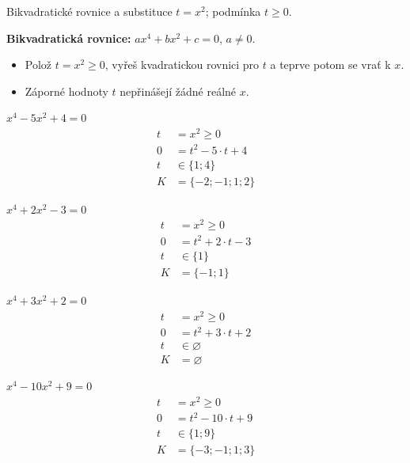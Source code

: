 \documentclass[11pt,a4paper]{article}
\begin{document}
Bikvadratické rovnice a substituce $t=x^2$; podmínka $t\ge0$.
\begin{definiceBox}[title={Definice - Bikvadratická rovnice}]
\textbf{Bikvadratická rovnice:} $ax^4+bx^2+c=0$, $a\ne0$.
\end{definiceBox}
\begin{itemize}
\item Polož $t=x^2\ge0$, vyřeš kvadratickou rovnici pro $t$ a teprve potom se vrať k $x$.
\item Záporné hodnoty $t$ nepřinášejí žádné reálné $x$.
\end{itemize}
\begin{prikladReseniBox}[title={Příklad 1}]
$x^{4} - 5x^{2} + 4=0$
\tcblower
\[
\begin{aligned}
t&=x^2\ge0\\[2pt]
0&=t^{2} - 5 \cdot t + 4\\[2pt]
t&\in\{1;4\}\\[2pt]
K&=\{-2;-1;1;2\}
\end{aligned}
\]
\end{prikladReseniBox}
\begin{prikladReseniBox}[title={Příklad 2}]
$x^{4} + 2x^{2} - 3=0$
\tcblower
\[
\begin{aligned}
t&=x^2\ge0\\[2pt]
0&=t^{2} + 2 \cdot t - 3\\[2pt]
t&\in\{1\}\\[2pt]
K&=\{-1;1\}
\end{aligned}
\]
\end{prikladReseniBox}
\begin{prikladReseniBox}[title={Příklad 3}]
$x^{4} + 3x^{2} + 2=0$
\tcblower
\[
\begin{aligned}
t&=x^2\ge0\\[2pt]
0&=t^{2} + 3 \cdot t + 2\\[2pt]
t&\in\varnothing\\[2pt]
K&=\varnothing
\end{aligned}
\]
\end{prikladReseniBox}
\begin{zadaniReseniBox}[title={Samostatná práce 1}]
$x^{4} - 10x^{2} + 9=0$
\tcblower
\[
\begin{aligned}
t&=x^2\ge0\\[2pt]
0&=t^{2} - 10 \cdot t + 9\\[2pt]
t&\in\{1;9\}\\[2pt]
K&=\{-3;-1;1;3\}
\end{aligned}
\]
\end{zadaniReseniBox}
\end{document}
